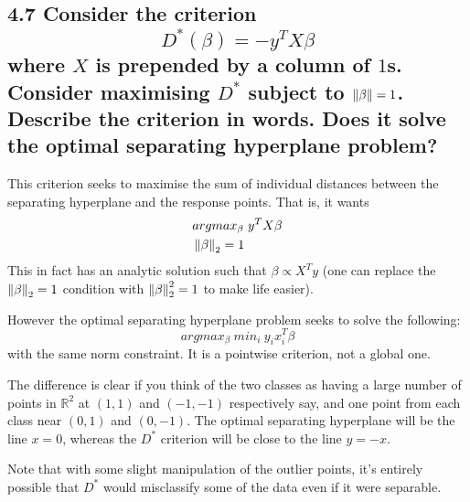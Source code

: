 \subsection*{4.7 Consider the criterion $$D^*(\beta) = - y^T X \beta$$
where $X$ is prepended by a column of $1$s. Consider maximising $D^*$ subject to $\left\lVert\beta\right\rVert = 1$.
Describe the criterion in words. Does it solve the optimal separating hyperplane problem?}

This criterion seeks to maximise the sum of individual distances between the separating hyperplane and the response points. That is, it wants 
\begin{align*}
    & argmax_\beta \hspace{3pt} y^T X \beta\\
    & \left\lVert\beta\right\rVert_2 = 1
\end{align*}
This in fact has an analytic solution such that $\beta \propto X^T y$ (one can replace the $\left\lVert\beta\right\rVert_2 = 1$ condition with $\left\lVert\beta\right\rVert^2_2 = 1$ to make life easier).

However the optimal separating hyperplane problem seeks to solve the following:
$$argmax_\beta \hspace{3pt} min_i  \hspace{3pt} y_i x_i^T \beta$$
with the same norm constraint. It is a pointwise criterion, not a global one.

The difference is clear if you think of the two classes as having a large number of points in $\mathbb{R}^2$ at $(1,1)$ and $(-1,-1)$ respectively say, and one point from each class near $(0,1)$ and $(0,-1)$.
The optimal separating hyperplane will be the line $x = 0$, whereas the $D^*$ criterion will be close to the line $y = -x$.

Note that with some slight manipulation of the outlier points, it's entirely possible that $D^*$ would misclassify some of the data even if it were separable.